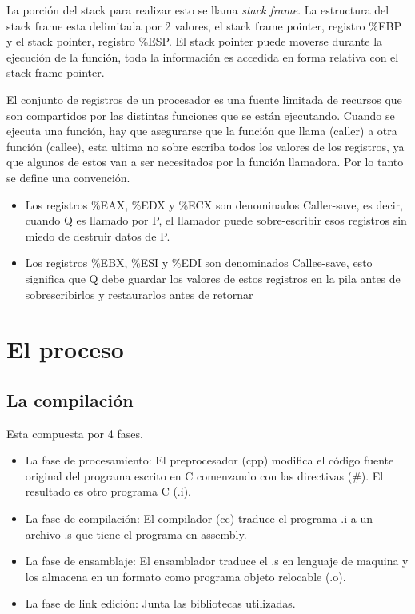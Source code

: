\documentclass[titlepage,a4paper]{article}
\begin{document}
La porción del stack para realizar esto se llama \textit{stack frame}. La estructura del stack frame esta delimitada por 2 valores, el stack frame pointer, registro \%EBP y el stack pointer, registro \%ESP. El stack pointer puede moverse durante la ejecución de la función, toda la información es accedida en forma relativa con el stack frame pointer.

El conjunto de registros de un procesador es una fuente limitada de recursos que son compartidos por las distintas funciones que se están ejecutando. Cuando se ejecuta una función, hay que asegurarse que la función que llama (caller) a otra función (callee), esta ultima no sobre escriba todos los valores de los registros, ya que algunos de estos van a ser necesitados por la función llamadora. Por lo tanto se define una convención. 

\begin{itemize}
    \item Los registros \%EAX, \%EDX y \%ECX son denominados Caller-save, es decir, cuando Q es llamado por P, el llamador puede sobre-escribir esos registros sin miedo de destruir datos de P.
    \item Los registros \%EBX, \%ESI y \%EDI son denominados Callee-save, esto significa que Q debe guardar los valores de estos registros en la pila antes de sobrescribirlos y restaurarlos antes de retornar
\end{itemize}

\section{El proceso}
\subsection*{La compilación}
Esta compuesta por 4 fases.
\begin{itemize}
    \item La fase de procesamiento: El preprocesador (cpp) modifica el código fuente original del programa escrito en C comenzando con las directivas (\#). El resultado es otro programa C (.i).
    \item La fase de compilación: El compilador (cc) traduce el programa .i a un archivo .s que tiene el programa en assembly.
    \item La fase de ensamblaje: El ensamblador traduce el .s en lenguaje de maquina y los almacena en un formato como programa objeto relocable (.o).
    \item La fase de link edición: Junta las bibliotecas utilizadas.
\end{itemize}
\end{document}
